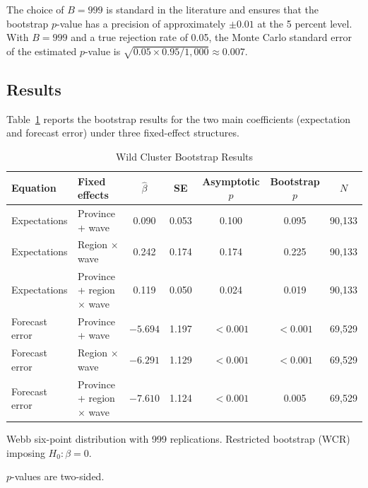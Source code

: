 The choice of $B = 999$ is standard in the literature and
ensures that the bootstrap $p$-value has a precision of
approximately $\pm 0.01$ at the 5 percent level.
With $B = 999$ and a true rejection rate of 0.05, the
Monte Carlo standard error of the estimated $p$-value is
$\sqrt{0.05 \times 0.95 / 1{,}000} \approx 0.007$.

\subsection{Results}

Table~\ref{tab:bootstrap_results} reports the bootstrap
results for the two main coefficients (expectation and
forecast error) under three fixed-effect structures.

\begin{table}[htbp]
\centering
\caption{Wild Cluster Bootstrap Results}
\label{tab:bootstrap_results}
\begin{threeparttable}
\small
\setlength{\tabcolsep}{4pt}
\begin{tabular}{llccccc}
\toprule
Equation & Fixed effects & $\hat{\beta}$ & SE &
  Asymptotic $p$ & Bootstrap $p$ & $N$ \\
\midrule
Expectations & Province + wave & 0.090 & 0.053
  & 0.100 & 0.095 & 90,133 \\
Expectations & Region $\times$ wave & 0.242 & 0.174
  & 0.174 & 0.225 & 90,133 \\
Expectations & Province + region $\times$ wave & 0.119 & 0.050
  & 0.024 & 0.019 & 90,133 \\[4pt]
Forecast error & Province + wave & $-5.694$ & 1.197
  & $<0.001$ & $<0.001$ & 69,529 \\
Forecast error & Region $\times$ wave & $-6.291$ & 1.129
  & $<0.001$ & $<0.001$ & 69,529 \\
Forecast error & Province + region $\times$ wave & $-7.610$ & 1.124
  & $<0.001$ & 0.005 & 69,529 \\
\bottomrule
\end{tabular}
\begin{tablenotes}[flushleft]
\footnotesize
\item Webb six-point distribution with 999 replications.
  Restricted bootstrap (WCR) imposing $H_0\colon \beta = 0$.
\item $p$-values are two-sided.
\end{tablenotes}
\end{threeparttable}
\end{table}


